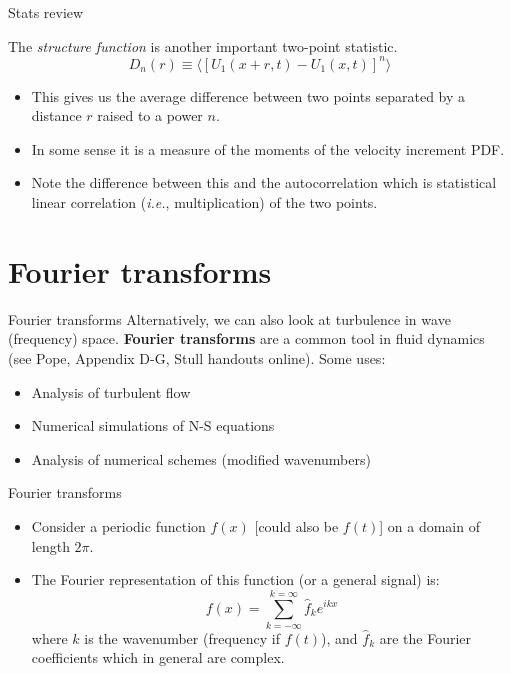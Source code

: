 
\begin{frame}{Stats review}
  
  The \textit{structure function} is another important two-point statistic.
  $$D_n(r) \equiv \langle [U_1(x+r,t) - U_1(x,t)]^n\rangle$$
  \begin{itemize}
  	\item This gives us the average difference between two points separated by a distance $r$ raised to a power $n$.
  	\item In some sense it is a measure of the moments of the velocity increment PDF.
  	\item Note the difference between this and the autocorrelation which is statistical linear correlation (\textit{i.e.}, multiplication) of the two points.
  \end{itemize}
  
\end{frame}

\section{Fourier transforms} %
\begin{frame}{Fourier transforms}
Alternatively, we can also look at turbulence in wave (frequency) space. \textbf{Fourier transforms} are a common tool in fluid dynamics (see Pope, Appendix D-G, Stull handouts online).\newline\newline
Some uses:
\begin{itemize}
	\item Analysis of turbulent flow
	\item Numerical simulations of N-S equations
	\item Analysis of numerical schemes (modified wavenumbers)
\end{itemize}
\end{frame}

\begin{frame}{Fourier transforms}

\begin{itemize}
	\item Consider a periodic function $f(x)$ [could also be $f(t)$] on a domain of length $2\pi$.	
	\item The Fourier representation of this function (or a general signal) is:
	$$f(x) = \sum^{k=\infty}_{k=-\infty} \hat f_k e^{ikx}$$
	where $k$ is the wavenumber (frequency if $f(t)$), and $\hat f_k$ are the Fourier coefficients which in general are complex.
\end{itemize}
\end{frame}

